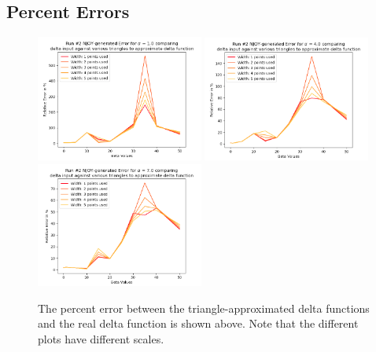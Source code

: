 \documentclass[a4paper]{article}
\begin{document}
\subsection{Percent Errors}
\begin{figure}[H]
\centering
\includegraphics[width=0.49\textwidth]{run2_error_not_scaled_alpha_equals_1.png}
\includegraphics[width=0.49\textwidth]{run2_error_not_scaled_alpha_equals_4.png}
\includegraphics[width=0.49\textwidth]{run2_error_not_scaled_alpha_equals_7.png}
\caption{\label{fig:run2_errorNotScaled}The percent error between the triangle-approximated delta functions and the real delta function is shown above. Note that the different plots have different scales. }
\end{figure}
\end{document}
